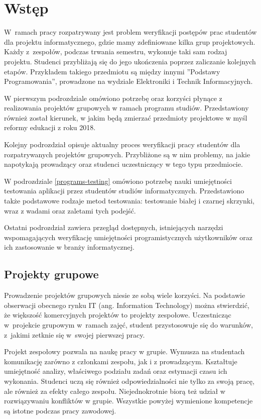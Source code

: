 \chapter{Wstęp}
\label{intro}

W~ramach pracy rozpatrywany jest problem weryfikacji postępów prac studentów dla projektu informatycznego, gdzie mamy zdefiniowane kilka grup projektowych.
Każdy z~zespołów, podczas trwania semestru, wykonuje taki sam rodzaj projektu.
Studenci przybliżają się do jego ukończenia poprzez zaliczanie kolejnych etapów.
Przykładem takiego przedmiotu są między innymi ”Podstawy Programowania”, prowadzone na wydziale Elektroniki i Technik Informacyjnych.

W pierwszym podrozdziale omówiono potrzebę oraz korzyści płynące z realizowania projektów grupowych w ramach programu studiów. 
Przedstawiony również został kierunek, w jakim będą zmierzać przedmioty projektowe w myśl reformy edukacji z roku 2018.

Kolejny podrozdział opisuje aktualny proces weryfikacji pracy studentów dla rozpatrywanych projektów grupowych.
Przybliżone są w nim problemy, na jakie napotykają prowadzący oraz studenci uczestniczący w tego typu przedmiocie.

W podrozdziale \ref{programs-testing} omówiono potrzebę nauki umiejętności testowania aplikacji przez studentów studiów informatycznych.
Przedstawiono także podstawowe rodzaje metod testowania: testowanie białej i czarnej skrzynki, wraz z wadami oraz zaletami tych podejść.

Ostatni podrozdział zawiera przegląd dostępnych, istniejących narzędzi wspomagających weryfikację umiejętności programistycznych użytkowników oraz ich zastosowanie w branży informatycznej.

\vfill

\section{Projekty grupowe}

Prowadzenie projektów grupowych niesie ze sobą wiele korzyści.
Na podstawie obserwacji obecnego rynku IT (ang. Information Technology) można stwierdzić, że większość komercyjnych projektów to projekty zespołowe.
Uczestnicząc w~projekcie grupowym w~ramach zajęć, student przystosowuje się do warunków, z~jakimi zetknie się w~swojej pierwszej pracy.

Projekt zespołowy pozwala na naukę pracy w grupie.
Wymusza na studentach komunikację zarówno z członkami zespołu, jak i z prowadzącym.
Kształtuje umiejętność analizy, właściwego podziału zadań oraz estymacji czasu ich wykonania.
Studenci uczą się również odpowiedzialności nie tylko za swoją pracę, ale również za efekty całego zespołu.
Niejednokrotnie biorą też udział w rozwiązywaniu konfliktów w grupie.
Wszystkie powyżej wymienione kompetencje są istotne podczas pracy zawodowej.


